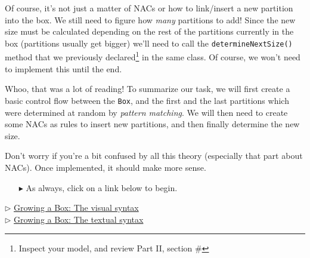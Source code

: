 \vfill
\newpage

Of course, it's not just a matter of NACs or how to link/insert a new partition into the box. We still need to figure how \emph{many} partitions to add! Since
the new size must be calculated depending on the rest of the partitions currently in the box (partitions usually get bigger) we'll need to call the
\texttt{determineNextSize()} method that we previously declared\footnote{Inspect your model, and review Part II, section \#} in the same class. Of course, we 
won't need to implement this until the end.

Whoo, that was a lot of reading! To summarize our task, we will first create a basic control flow between the \texttt{Box}, and the first and the last
partitions which were determined at random by \emph{pattern matching}. We will then need to create some NACs as rules to insert new partitions, and then 
finally determine the new size.

Don't worry if you're a bit confused by all this theory (especially that part about \mbox{NAC}s). Once implemented, it should make more sense.

\vspace{0.5cm}
\begin{itemize}
\item[$\blacktriangleright$] As always, click on a link below to begin.
\end{itemize}

\begin{center} {$\triangleright$ \hyperlink{growBox vis}{Growing a Box: The visual syntax}}%
\\ \vspace{0.5cm}
 {$\triangleright$ \hyperlink{growBox tex}{Growing a Box: The textual syntax}}\end{center} 




